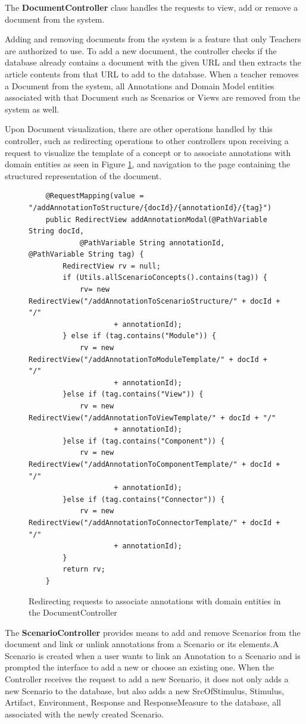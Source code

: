 \documentclass{llncs}
\begin{document}
The \textbf{DocumentController} class handles the requests to view, add or remove a document from the system.

Adding and removing documents from the system is a feature that only Teachers are authorized to use. 
To add a new document, the controller checks if the database already contains a document with the given URL and then extracts the article contents from that URL to add to the database. When a teacher removes a Document from the system, all Annotations and Domain Model entities associated with that Document such as Scenarios or Views are removed from the system as well.

Upon Document visualization, there are other operations handled by this controller, such as redirecting operations to other controllers upon receiving a request to visualize the template of a concept or to associate annotations with domain entities as seen in Figure \ref{figure:documentControllerLinkAnnotation}, and navigation to the page containing the structured representation of the document.

\begin{figure}
\lstset{style=customjava}
\begin{lstlisting}
	@RequestMapping(value = "/addAnnotationToStructure/{docId}/{annotationId}/{tag}")
	public RedirectView addAnnotationModal(@PathVariable String docId,
			@PathVariable String annotationId, @PathVariable String tag) {
		RedirectView rv = null;
		if (Utils.allScenarioConcepts().contains(tag)) {
			rv= new RedirectView("/addAnnotationToScenarioStructure/" + docId + "/"
					+ annotationId);
		} else if (tag.contains("Module")) {
			rv = new RedirectView("/addAnnotationToModuleTemplate/" + docId + "/"
					+ annotationId);
		}else if (tag.contains("View")) {
			rv = new RedirectView("/addAnnotationToViewTemplate/" + docId + "/"
					+ annotationId);
		}else if (tag.contains("Component")) {
			rv = new RedirectView("/addAnnotationToComponentTemplate/" + docId + "/"
					+ annotationId);
		}else if (tag.contains("Connector")) {
			rv = new RedirectView("/addAnnotationToConnectorTemplate/" + docId + "/"
					+ annotationId);
		}
		return rv;
	}	
\end{lstlisting}
\caption{Redirecting requests to associate annotations with domain entities in the DocumentController}
\label{figure:documentControllerLinkAnnotation}
\end{figure}

The \textbf{ScenarioController} provides means to add and remove Scenarios from the document and link or unlink annotations from a Scenario or its elements.A Scenario is created when a user wants to link an Annotation to a Scenario and is prompted the interface to add a new or choose an existing one. When the Controller receives the request to add a new Scenario, it does not only adds a new Scenario to the database, but also adds a new SrcOfStimulus, Stimulus, Artifact, Environment, Response and ResponseMeasure to the database, all associated with the newly created Scenario. 
\end{document}
